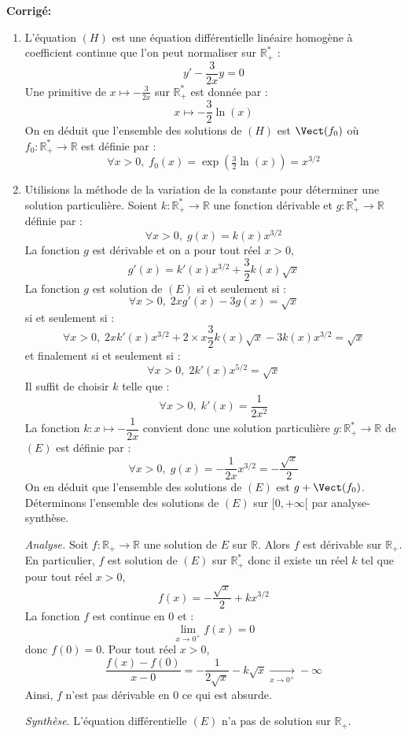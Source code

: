 \documentclass[a4paper,twoside,french,11pt]{VcCours}
\newcommand{\corr}{\textbf{Corrigé:}}
\begin{document}
\corr \begin{enumerate}
\item L'équation $(H)$ est une équation différentielle linéaire homogène à coefficient continue que l'on peut normaliser sur $\mathbb{R}_+^{*}$ :
$$ y' - \dfrac{3}{2x} y = 0$$
Une primitive de $x \mapsto -\tfrac{3}{2x}$ sur $\mathbb{R}_+^*$ est donnée par :
$$ x \mapsto - \dfrac{3}{2} \ln(x)$$
On en déduit que l'ensemble des solutions de $(H)$ est $\Vect(f_0)$ où $f_0 : \mathbb{R}_+^* \rightarrow \mathbb{R}$ est définie par :
$$ \forall x>0, \; f_0(x) = \exp ( \tfrac{3}{2} \ln(x)) = x^{3/2}$$

\item Utilisions la méthode de la variation de la constante pour déterminer une solution particulière. Soient \newline $k : \mathbb{R}_+^* \rightarrow \mathbb{R}$ une fonction dérivable et $g : \mathbb{R}_+^* \rightarrow \mathbb{R}$ définie par :
$$ \forall x>0, \; g(x) = k(x) x^{3/2}$$
La fonction $g$ est dérivable et on a pour tout réel $x>0$,
$$ g'(x) = k'(x) x^{3/2} + \dfrac{3}{2} k(x) \sqrt{x}$$
La fonction $g$ est solution de $(E)$ si et seulement si :
$$ \forall x>0, \; 2xg'(x)-3g(x)=\sqrt{x}$$
si et seulement si :
$$ \forall x>0, \; 2x k'(x) x^{3/2} + 2 \times x \dfrac{3}{2} k(x) \sqrt{x} - 3 k(x) x^{3/2} = \sqrt{x}$$
et finalement si et seulement si :
$$  \forall x>0, \; 2k'(x) x^{5/2} = \sqrt{x}$$
Il suffit de choisir $k$ telle que :
$$ \forall x>0, \; k'(x) = \dfrac{1}{2x^2}$$
La fonction $k : x \mapsto - \dfrac{1}{2x}$ convient donc une solution particulière $g : \mathbb{R}_+^* \rightarrow \mathbb{R}$ de $(E)$ est définie par :
$$ \forall x>0, \; g(x) = - \dfrac{1}{2x} x^{3/2} =- \dfrac{\sqrt{x}}{2}$$
On en déduit que l'ensemble des solutions de $(E)$ est $g + \Vect(f_0)$.
Déterminons l'ensemble des solutions de $(E)$ sur $[0, + \infty[$ par analyse-synthèse.


\textit{Analyse.} Soit $f : \mathbb{R}_+ \rightarrow \mathbb{R}$ une solution de $E$ sur $\mathbb{R}$. Alors $f$ est dérivable sur $\mathbb{R}_+$. En particulier, $f$ est solution de $(E)$ sur $\mathbb{R}_+^{*}$ donc il existe un réel $k$ tel que pour tout réel $x>0$,
$$ f(x)= - \dfrac{\sqrt{x}}{2} + k x^{3/2}$$
La fonction $f$ est continue en $0$ et :
$$ \lim_{x \rightarrow 0^+} f(x) = 0$$
donc $f(0)=0$. Pour tout réel $x>0$,
$$ \dfrac{f(x)-f(0)}{x-0} =- \dfrac{1}{2\sqrt{x}} - k \sqrt{x} \underset{x \rightarrow 0^+}{\longrightarrow} - \infty$$
Ainsi, $f$ n'est pas dérivable en $0$ ce qui est absurde.


\textit{Synthèse}. L'équation différentielle $(E)$ n'a pas de solution sur $\mathbb{R}_+$.
\end{enumerate}
\end{document}
